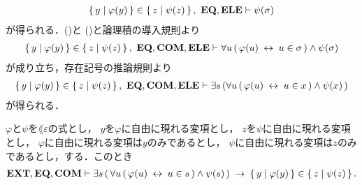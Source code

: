 \begin{sketch}
\begin{align}
			\left\{\, y \mid \varphi(y)\, \right\} \in \left\{\, z \mid \psi(z)\, \right\},\ \mbox{{\bf EQ}},\mbox{{\bf ELE}} \vdash 
			\psi(\sigma)
			\label{fom:equivalent_formula_rewriting_11_3}
		\end{align}
		が得られる．()と
		()と論理積の導入規則より
		\begin{align}
			\Set{y}{\varphi(y)} \in \Set{z}{\psi(z)},\ \EQAX,\COMAX,\ELEAX \vdash
			\forall u\, (\, \varphi(u) \lrarrow u \in \sigma\, ) \wedge \psi(\sigma)
		\end{align}
		が成り立ち，存在記号の推論規則より
		\begin{align}
			\Set{y}{\varphi(y)} \in \Set{z}{\psi(z)},\ \EQAX,\COMAX,\ELEAX \vdash
			\exists s\, (\forall u\, (\, \varphi(u) \lrarrow u \in x\, ) \wedge \psi(x)\, )
		\end{align}
		が得られる．
		\QED
	\end{sketch}
	
	\begin{screen}
		\begin{thm}
		\label{thm:equivalent_formula_rewriting_12}
			$\varphi$と$\psi$を$\lang{\varepsilon}$の式とし，
			$y$を$\varphi$に自由に現れる変項とし，
			$z$を$\psi$に自由に現れる変項とし，
			$\varphi$に自由に現れる変項は$y$のみであるとし，
			$\psi$に自由に現れる変項は$z$のみであるとし，する．このとき
			\begin{align}
				\mbox{{\bf EXT}},\mbox{{\bf EQ}},\mbox{\bf COM} \vdash \exists s\, (\, \forall u\, (\, \varphi(u) \hspace{0.25em}\leftrightarrow\hspace{0.25em} u \in s\, ) \wedge \psi(s)\, ) \hspace{0.25em}\rightarrow\hspace{0.25em} \left\{\, y \mid \varphi(y)\, \right\} \in \left\{\, z \mid \psi(z)\, \right\}.
			\end{align}
		\end{thm}
	\end{screen}
	
